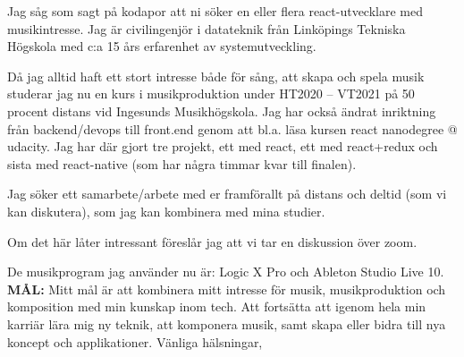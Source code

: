 
\clearpage
\Large
{}
\large

Jag såg som sagt på kodapor att ni söker en eller flera react-utvecklare med musikintresse.
Jag är civilingenjör i datateknik från Linköpings Tekniska Högskola med c:a 15 års erfarenhet av systemutveckling. 

Då jag alltid haft ett stort intresse både för sång, att skapa och spela musik studerar jag nu en kurs i musikproduktion under HT2020 – VT2021 på 50 procent distans vid Ingesunds Musikhögskola. Jag har också ändrat inriktning från backend/devops till front.end genom att bl.a. läsa kursen react nanodegree @ udacity. Jag har där gjort tre projekt, ett med react, ett med react+redux och sista med react-native (som har några timmar kvar till finalen).

Jag söker ett samarbete/arbete med er framförallt på distans och deltid (som vi kan diskutera), som jag kan kombinera med mina studier.

Om det här låter intressant föreslår jag att vi tar en diskussion över zoom.

De musikprogram jag använder nu är: Logic X Pro och Ableton Studio Live 10.
\newline
\newline\textbf{MÅL:}
Mitt mål är att kombinera mitt intresse för musik, musikproduktion och komposition med min kunskap inom tech. Att fortsätta att igenom hela min karriär lära mig ny teknik, att komponera musik, samt skapa eller bidra till nya koncept och applikationer.
\newline
\newline
Vänliga hälsningar,
\makeletterclosing

